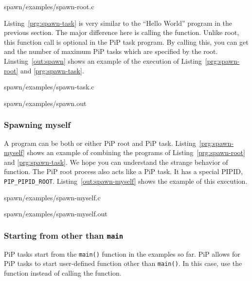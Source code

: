  {spawn/examples/spawn-root.c}

Listing~\ref{prg:spawn-task} is very similar to the ``Hello World''
program in the previous section. The major difference here is calling
the  function. Unlike root, this function call is
optional in the PiP task program. By calling this, you can get 
{\PIPID} and the number of maximum PiP tasks which are specified by the
root. Linsting~\ref{out:spawn} shows an example of the execution of
Listing~\ref{prg:spawn-root} and \ref{prg:spawn-task}. 


                {spawn/examples/spawn-task.c}


                {spawn/examples/spawn.out}

\subsubsection{Spawning myself}

A program can be both or either PiP root and PiP
task. Listing~\ref{prg:spawn-myself} shows an example of combining the
programs of Listing~\ref{prg:spawn-root} and \ref{prg:spawn-task}. We
hope you can understand the strange behavior of 
function. The PiP root process also acts like a PiP task. It has a
special PIPID, {\tt PIP_PIPID_ROOT}. 
Listing~\ref{out:spawn-myself} shows the example of this
execution. 


                {spawn/examples/spawn-myself.c}


                {spawn/examples/spawn-myself.out}

\subsubsection{Starting from other than {\tt main}}\label{sec:spawn-func}

PiP tasks start from the {\tt main()} function in the examples so
far. PiP allows for PiP tasks to start user-defined function other
than {\tt main()}. In this case, use the 
function instead of calling the  function.

